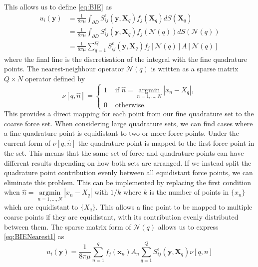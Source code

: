 This allows us to define \cref{eq:BIE} as 
\begin{equation}
\begin{aligned}
\label{eq:BIENearest1}
        u_i(\bm{y}) &= \frac{1}{8 \pi \mu} \int_{\partial D} S_{i j}^{\epsilon}\left(\bm{y}, \bm{X}_q\right) f_{j}(\bm{X}_q) d S(\bm{X}_q) \\
        &= \frac{1}{8 \pi \mu} \int_{\partial D} S_{i j}^{\epsilon}\left(\bm{y}, \bm{X}_q\right) f_{j}(\mathcal{N}(q)) d S(\mathcal{N}(q)) \\
        & = \frac{1}{8 \pi \mu} \sum_{q=1}^Q S_{i j}^{\epsilon}\left(\bm{y}, \bm{X}_q\right){f_{j}}[\mathcal{N}(q)]A[\mathcal{N}(q)]
\end{aligned}
\end{equation}
where the final line is the discretisation of the integral with the fine quadrature points. The nearest-neighbour operator $\mathcal{N}(q)$ is written as a sparse matrix $Q \times N$ operator defined by
\begin{equation}
\label{eq:NNMatrix}
    \nu [q, \hat{n}]= \begin{cases} 1 & \text { if } \hat{n}=\underset{n=1, \ldots, N}{\operatorname{argmin}}|x_n-X_q| , \\ 0 & \text { otherwise. }\end{cases}
\end{equation}
This provides a direct mapping for each point from our fine quadrature set to the coarse force set. When considering large quadrature sets, we can find cases where a fine quadrature point is equidistant to two or more force points. Under the current form of $\nu [q, \hat{n}]$ the quadrature point is mapped to the first force point in the set. This means that the same set of force and quadrature points can have different results depending on how both sets are arranged. If we instead split the quadrature point contribution evenly between all equidistant force points, we can eliminate this problem. This can be implemented by replacing the first condition when $\hat{n}=\underset{n=1, \ldots, N}{\operatorname{argmin}}|x_n-X_q|$ with $1/k$ where $k$ is the number of points in $\{x_n\}$ which are equidistant to $\{X_q\}$. This allows a fine point to be mapped to multiple coarse points if they are equidistant, with its contribution evenly distributed between them. The sparse matrix form of $\mathcal{N}(q)$ allows us to express \cref{eq:BIENearest1} as 
\begin{equation}
    u_i(\bm{y}) = \frac{1}{8 \pi \mu} \sum_{n=1}^q  f_{j}(\bm{x}_n) A_n \sum_{q=1}^{Q}S_{i j}^{\epsilon}\left(\bm{y}, \bm{X}_q\right) \nu[q,n] 
\end{equation}
